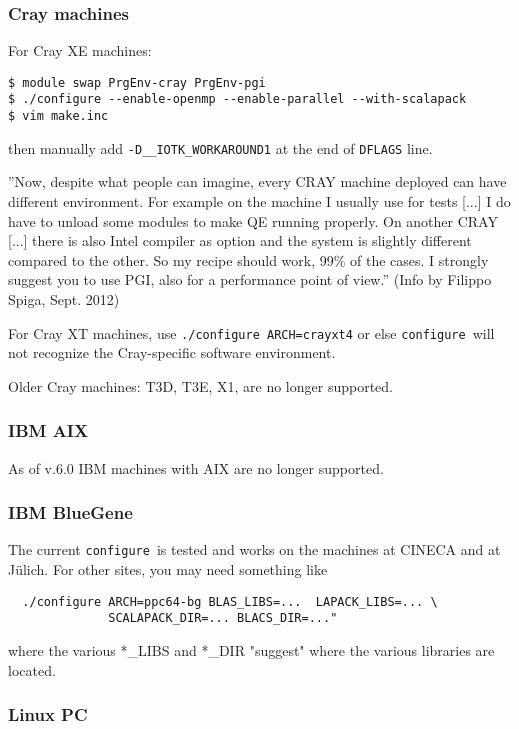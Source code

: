 \documentclass[12pt,a4paper]{article}
\def\configure{\texttt{configure}}
\begin{document}
\subsubsection{Cray machines}

For Cray XE machines:
\begin{verbatim}
$ module swap PrgEnv-cray PrgEnv-pgi
$ ./configure --enable-openmp --enable-parallel --with-scalapack
$ vim make.inc
\end{verbatim}
then manually add \texttt{-D\_\_IOTK\_WORKAROUND1} at the end of \texttt{DFLAGS} line.

''Now, despite what people can imagine, every CRAY machine deployed can
have different environment. For example on the machine I usually use
for tests [...] I do have to unload some modules to make QE running
properly. On another CRAY [...] there is also Intel compiler as option
and the system is slightly different compared to the other.
So my recipe should work, 99\% of the cases.
I strongly suggest you to use PGI, also for a performance point of view.''
(Info by Filippo Spiga, Sept. 2012)

For Cray XT machines, use \texttt{./configure ARCH=crayxt4} or else
\configure\ will not recognize the Cray-specific software environment.

Older Cray machines: T3D, T3E, X1, are no longer supported.

\subsubsection{IBM AIX}

As of v.6.0 IBM machines with AIX are no longer supported.

\subsubsection{IBM BlueGene}

The current \configure\ is tested and works on the machines at CINECA
and at J\"ulich. For other sites, you may need something like
\begin{verbatim}
  ./configure ARCH=ppc64-bg BLAS_LIBS=...  LAPACK_LIBS=... \
              SCALAPACK_DIR=... BLACS_DIR=..."
\end{verbatim}
where the various *\_LIBS and *\_DIR "suggest" where the various libraries
are located.

\subsubsection{Linux PC}
\end{document}

